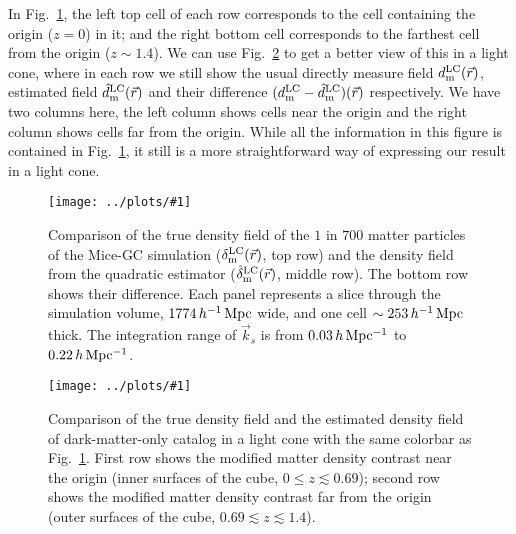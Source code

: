 \documentclass[prd,amsmath,amssymb,floatfix,superscriptaddress,nofootinbib,twocolumn]{revtex4-1}
\newcommand{\LC}{\rm LC}
\newcommand{\vrr}{\vec{r}}
\newcommand{\vk}{\vec{k}}
\newcommand{\rf}[1]{\ref{fig:#1}}
\newcommand{\sfig}[2]{
\texttt{[image: ../plots/\#1]}
        }
\newcommand{\Sfig}[2]{
   \begin{figure}[thbp]
   \begin{center}
    \sfig{../plots/#1.pdf}{\columnwidth}
    \caption{{\small #2}}
    \label{fig:#1}
     \end{center}
   \end{figure}
}
\begin{document}
In Fig.~\rf{real_dm}, the left top cell of each row corresponds to the cell containing the origin ($z=0$) in it; and the right bottom cell corresponds to the farthest cell from the origin ($z\sim 1.4$). We can use Fig.~\rf{cube_dm} to get a better view of this in a light cone, where in each row we still show the usual directly measure field $d_{\rm m}^{\LC}(\vrr)$, estimated field $\hat{d}_{\rm m}^{\LC}(\vrr)$ and their difference $(d_{\rm m}^{\LC}-\hat{d}_{\rm m}^{\LC})(\vrr)$ respectively. We have two columns here, the left column shows cells near the origin and the right column shows cells far from the origin. While all the information in this figure is contained in Fig.~\rf{real_dm}, it still is a more straightforward way of expressing our result in a light cone. 


\Sfig{real_dm}{Comparison of the true density field of the $1$ in $700$ matter particles of the Mice-GC simulation ($\delta^{\rm LC}_{\rm m}(\vrr)$, top row) and the density field from the quadratic estimator ($\hat{\delta}_{\rm m}^{\rm LC}(\vrr)$, middle row). The bottom row shows their difference. Each panel represents a slice through the simulation volume, $1774\,h^{-1}\rm \, Mpc$ wide, and one cell $\sim 253\,h^{-1}\rm \, Mpc$ thick. The integration range of $\vk_{s}$ is from $0.03\, h \rm \, Mpc^{-1}$ to $0.22\, h \rm \, Mpc^{-1}$.}
\Sfig{cube_dm}{Comparison of the true density field and the estimated density field of dark-matter-only catalog in a light cone with the same colorbar as Fig.~\rf{real_dm}. First row shows the modified matter density contrast near the origin (inner surfaces of the cube, $0\leqslant z \lesssim 0.69$); second row shows the modified matter density contrast far from the origin (outer surfaces of the cube, $0.69\lesssim z \lesssim 1.4$).}
\end{document}
